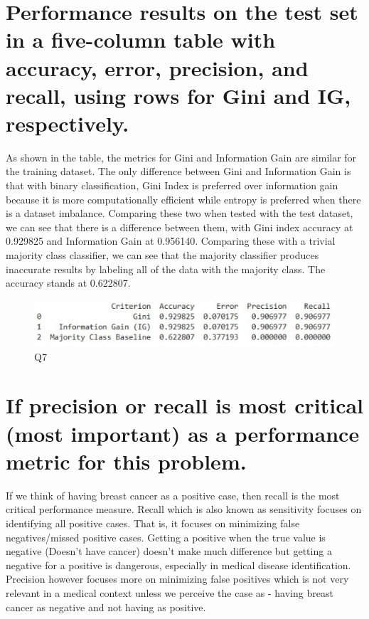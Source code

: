 \documentclass[a4paper]{article}
\begin{document}
\section*{Performance results on the test set in a five-column table with accuracy, error, precision, and recall, using rows for Gini and IG, respectively.}
As shown in the table, the metrics for Gini and Information Gain are similar for the training dataset. The only difference between Gini and Information Gain is that with binary classification, Gini Index is preferred over information gain because it is more computationally efficient while entropy is preferred when there is a dataset imbalance. Comparing these two when tested with the test dataset, we can see that there is a difference between them, with Gini index accuracy at 0.929825 and Information Gain at 0.956140. Comparing these with a trivial majority class classifier, we can see that the majority classifier produces inaccurate results by labeling all of the data with the majority class. The accuracy stands at 0.622807.
\newpage
\begin{figure}
    \centering
    \includegraphics[width=0.5\linewidth]{table.jpg}
    \caption{Q7}
    \label{fig:enter-label}
\end{figure}

\section*{If precision or recall is most critical (most important) as a performance metric for this problem.}
If we think of having breast cancer as a positive case, then recall is the most critical performance measure. Recall which is also known as sensitivity focuses on identifying all positive cases. That is, it focuses on minimizing false negatives/missed positive cases. Getting a positive when the true value is negative (Doesn’t have cancer) doesn’t make much difference but getting a negative for a positive is dangerous, especially in medical disease identification. Precision however focuses more on minimizing false positives which is not very relevant in a medical context unless we perceive the case as - having breast cancer as negative and not having as positive.
\end{document}
